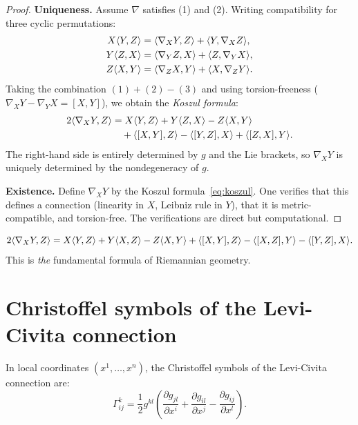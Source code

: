 \begin{proof}
\textbf{Uniqueness.} Assume $\nabla$ satisfies (1) and (2). Writing compatibility
for three cyclic permutations:
\begin{align*}
    X\langle Y, Z \rangle &= \langle \nabla_X Y, Z \rangle + \langle Y, \nabla_X Z \rangle, \\
    Y\langle Z, X \rangle &= \langle \nabla_Y Z, X \rangle + \langle Z, \nabla_Y X \rangle, \\
    Z\langle X, Y \rangle &= \langle \nabla_Z X, Y \rangle + \langle X, \nabla_Z Y \rangle.
\end{align*}
Taking the combination $(1) + (2) - (3)$ and using torsion-freeness
($\nabla_X Y - \nabla_Y X = [X,Y]$), we obtain the \emph{Koszul formula}:
\begin{align}
    2\langle \nabla_X Y, Z \rangle &= X\langle Y, Z \rangle + Y\langle Z, X \rangle - Z\langle X, Y \rangle
    \notag \\
    &\quad + \langle [X,Y], Z \rangle - \langle [Y,Z], X \rangle + \langle [Z,X], Y \rangle.
    \label{eq:koszul}
\end{align}
The right-hand side is entirely determined by $g$ and the Lie brackets, so
$\nabla_X Y$ is uniquely determined by the nondegeneracy of $g$.

\textbf{Existence.} Define $\nabla_X Y$ by the Koszul formula~\eqref{eq:koszul}.
One verifies that this defines a connection (linearity in $X$, Leibniz rule
in $Y$), that it is metric-compatible, and torsion-free. The verifications are
direct but computational.
\end{proof}

\begin{keyformulas}[title=\textbf{Koszul formula}]
\[
    2\langle \nabla_X Y, Z \rangle = X\langle Y, Z \rangle + Y\langle X, Z \rangle - Z\langle X, Y \rangle
    + \langle [X,Y], Z \rangle - \langle [X,Z], Y \rangle - \langle [Y,Z], X \rangle.
\]
This is \emph{the} fundamental formula of Riemannian geometry.
\end{keyformulas}

\section{Christoffel symbols of the Levi-Civita connection}

\begin{proposition}
In local coordinates $(x^1, \ldots, x^n)$, the Christoffel symbols of the
Levi-Civita connection are:
\[
    \Gamma^k_{ij} = \frac{1}{2} g^{kl}
    \left(\frac{\partial g_{jl}}{\partial x^i}
    + \frac{\partial g_{il}}{\partial x^j}
    - \frac{\partial g_{ij}}{\partial x^l}\right).
\]
\end{proposition}


